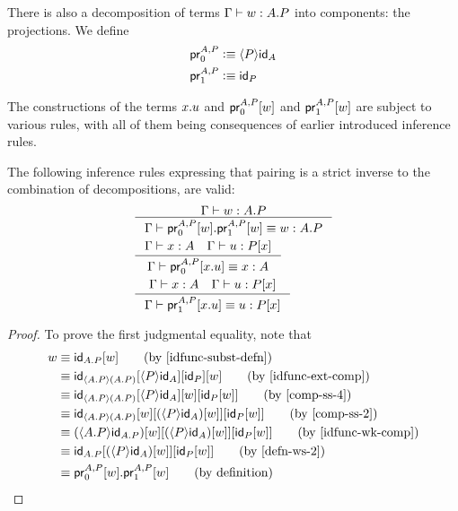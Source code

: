 There is also a decomposition of terms $\jterm{\Gamma}{\ctxext{A}{P}}{w}$ into
components: the projections. We define
\begin{align*}
\cprojfstf{A}{P} & \defeq \ctxwk{P}{\idfunc[A]}\\
\cprojsndf{A}{P} & \defeq \idfunc[P]
\end{align*}

The constructions of the terms $\ctxext{x}{u}$ and $\cprojfst{A}{P}{w}$ and
$\cprojsnd{A}{P}{w}$ are subject to various rules, with all of them being
consequences of earlier introduced inference rules.

\begin{lem} The following inference rules expressing that pairing is a strict
inverse to the combination of decompositions, are valid:
\begin{align*}
& \inference{\jterm{\Gamma}{\ctxext{A}{P}}{w}}{\jtermeq{\Gamma}{\ctxext{A}{P}}{\ctxext{\cprojfst{A}{P}{w}}{\cprojsnd{A}{P}{w}}}{w}}\\
& \inference{\jterm{\Gamma}{A}{x}\quad\jterm{\Gamma}{\subst{x}{P}}{u}}{\jtermeq{\Gamma}{A}{\cprojfst{A}{P}{\ctxext{x}{u}}}{x}}\\
& \inference{\jterm{\Gamma}{A}{x}\quad\jterm{\Gamma}{\subst{x}{P}}{u}}{\jtermeq{\Gamma}{\subst{x}{P}}{\cprojsnd{A}{P}{\ctxext{x}{u}}}{u}}
\end{align*}
\end{lem}

\begin{proof}
To prove the first judgmental equality, note that
\begin{align*}
w & \jdeq \subst{w}{\idfunc[\ctxext{A}{P}]} \tag{by \autoref{idfunc-subst-defn}}\\
& \jdeq \subst{w}{\subst{\idfunc[P]}{{\ctxwk{P}{\idfunc[A]}}{\idfunc[\ctxwk{\ctxext{A}{P}}{\ctxext{A}{P}}]}}}
  \tag{by \autoref{idfunc-ext-comp}}\\
& \jdeq \subst{{w}{\idfunc[P]}}{\subst{w}{{\ctxwk{P}{\idfunc[A]}}{\idfunc[\ctxwk{\ctxext{A}{P}}{\ctxext{A}{P}}]}}}\tag{by \autoref{comp-ss-4}}\\
& \jdeq \subst{{w}{\idfunc[P]}}{{\subst{w}{\ctxwk{P}{\idfunc[A]}}}{\subst{w}{\idfunc[\ctxwk{\ctxext{A}{P}}{\ctxext{A}{P}}]}}}\tag{by \autoref{comp-ss-2}}\\
& \jdeq \subst{{w}{\idfunc[P]}}{{\subst{w}{\ctxwk{P}{\idfunc[A]}}}{\subst{w}{\ctxwk{\ctxext{A}{P}}{\idfunc[\ctxext{A}{P}]}}}}\tag{by \autoref{idfunc-wk-comp}}\\
& \jdeq \subst{{w}{\idfunc[P]}}{{\subst{w}{\ctxwk{P}{\idfunc[A]}}}{\idfunc[\ctxext{A}{P}]}}\tag{by \autoref{defn-ws-2}}\\
& \jdeq \ctxext{\cprojfst{A}{P}{w}}{\cprojsnd{A}{P}{w}}\tag{by definition}
\end{align*}
\end{proof}


